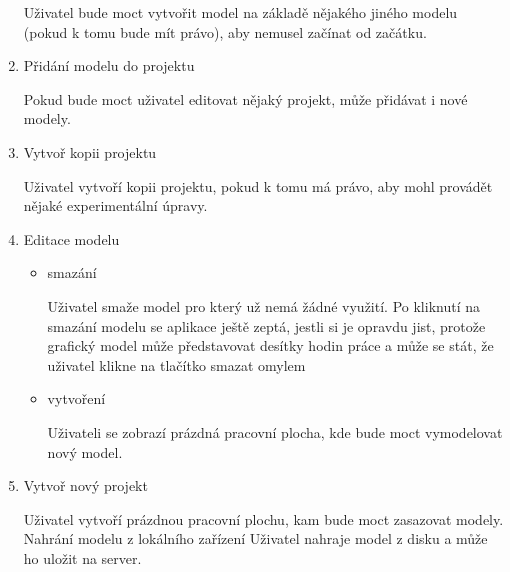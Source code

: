 \documentclass[thesis=B,czech]{FITthesis}[2012/06/26]
\begin{document}
\begin{enumerate}
                Uživatel bude moct vytvořit model na základě nějakého jiného modelu (pokud k tomu bude mít právo), aby nemusel začínat od začátku.
                \item Přidání modelu do projektu
                
                Pokud bude moct uživatel editovat nějaký projekt, může přidávat i nové modely.
               \item Vytvoř kopii projektu
               
                Uživatel vytvoří kopii projektu, pokud k tomu má právo, aby mohl provádět nějaké experimentální úpravy.
               \item Editace modelu
               
               \begin{itemize}
                    \item smazání
                   
                    Uživatel smaže model pro který už nemá žádné využití. Po kliknutí na smazání modelu se aplikace ještě zeptá, jestli si je opravdu jist, protože grafický model může představovat desítky hodin práce a může se stát, že uživatel klikne na tlačítko smazat omylem
                    \item vytvoření
                    
                    Uživateli se zobrazí prázdná pracovní plocha, kde bude moct vymodelovat nový model.
                \end{itemize}
                \item Vytvoř nový projekt
                
                Uživatel vytvoří prázdnou pracovní plochu, kam bude moct zasazovat modely.
                Nahrání modelu z lokálního zařízení
                Uživatel nahraje model z disku a může ho uložit na server.
            \end{enumerate}
\end{document}
